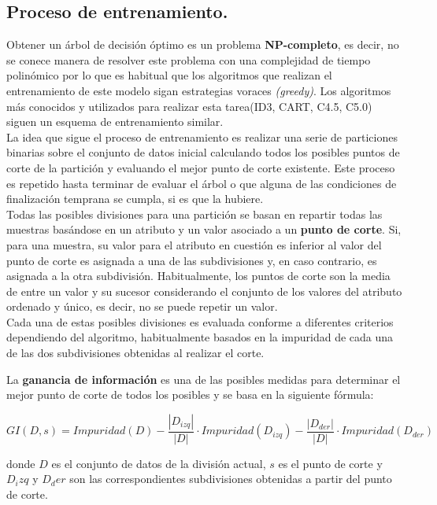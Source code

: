 \subsection{Proceso de entrenamiento.} 

Obtener un árbol de decisión óptimo es un problema \textbf{NP-completo}, es decir, no se conece manera de resolver este problema con una complejidad de tiempo polinómico por lo que es habitual que los algoritmos que realizan el entrenamiento de este modelo sigan estrategias voraces \textit{(greedy)}. Los algoritmos más conocidos y utilizados para realizar esta tarea(ID3, CART, C4.5, C5.0) siguen un esquema de entrenamiento similar. \\

La idea que sigue el proceso de entrenamiento es realizar una serie de particiones binarias sobre el conjunto de datos inicial calculando todos los posibles puntos de corte de la partición y evaluando el mejor punto de corte existente. Este proceso es repetido hasta terminar de evaluar el árbol o que alguna de las condiciones de finalización temprana se cumpla, si es que la hubiere.\\

Todas las posibles divisiones para una partición se basan en repartir todas las muestras basándose en un atributo y un valor asociado a un \textbf{punto de corte}. Si, para una muestra, su valor para el atributo en cuestión es inferior al valor del punto de corte es asignada a una de las subdivisiones y, en caso contrario, es asignada a la otra subdivisión. Habitualmente, los puntos de corte son la media de entre un valor y su sucesor considerando el conjunto de los valores del atributo ordenado y único, es decir, no se puede repetir un valor.\\

Cada una de estas posibles divisiones es evaluada conforme a diferentes criterios dependiendo del algoritmo, habitualmente basados en la impuridad de cada una de las dos subdivisiones obtenidas al realizar el corte. 

La \textbf{ganancia de información} es una de las posibles medidas para determinar el mejor punto de corte de todos los posibles y se basa en la siguiente fórmula:

$$
GI(D,s) = Impuridad(D) - \frac{|D_{izq}|}{|D|} \cdot Impuridad(D_{izq}) - \frac{|D_{der}|}{|D|} \cdot Impuridad(D_{der})
$$

donde $D$ es el conjunto de datos de la división actual, $s$ es el punto de corte y $D_izq$ y $D_der$ son las correspondientes subdivisiones obtenidas a partir del punto de corte.\\

